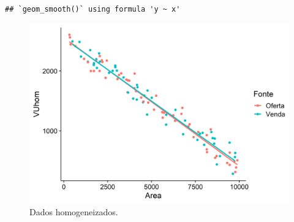 \documentclass{article}
\begin{document}
\begin{verbatim}
## `geom_smooth()` using formula 'y ~ x'
\end{verbatim}

\begin{figure}
\centering
\includegraphics{./images/dadosHomogeneizados-1.png}
\caption{Dados homogeneizados.}
\end{figure}
\end{document}
